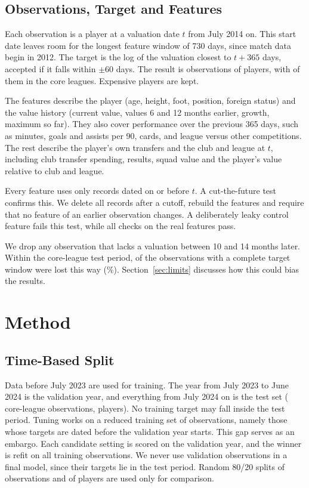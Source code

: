 \documentclass[conference]{IEEEtran}
\begin{document}
\subsection{Observations, Target and Features}
Each observation is a player at a valuation date $t$ from July 2014 on. This start date leaves room for the longest feature window of 730 days, since match data begin in 2012. The target is the log of the valuation closest to $t+365$ days, accepted if it falls within $\pm$60 days. The result is \NRows{} observations of \NPlayers{} players, with \NCoreRows{} of them in the core leagues. Expensive players are kept.

The \NFeatures{} features describe the player (age, height, foot, position, foreign status) and the value history (current value, values 6 and 12 months earlier, growth, maximum so far). They also cover performance over the previous 365 days, such as minutes, goals and assists per 90, cards, and league versus other competitions. The rest describe the player's own transfers and the club and league at $t$, including club transfer spending, results, squad value and the player's value relative to club and league.

Every feature uses only records dated on or before $t$. A cut-the-future test confirms this. We delete all records after a cutoff, rebuild the features and require that no feature of an earlier observation changes. A deliberately leaky control feature fails this test, while all \NLeakPassed{} checks on the real features pass.

We drop any observation that lacks a valuation between 10 and 14 months later. Within the core-league test period, \DropTest{} of the \DropTestComplete{} observations with a complete target window were lost this way (\DropRateTest\%). Section~\ref{sec:limits} discusses how this could bias the results.

\section{Method}

\subsection{Time-Based Split}
Data before July 2023 are used for training. The year from July 2023 to June 2024 is the validation year, and everything from July 2024 on is the test set (\NTest{} core-league observations, \NTestPlayers{} players). No training target may fall inside the test period. Tuning works on a reduced training set of \NTune{} observations, namely those whose targets are dated before the validation year starts. This gap serves as an embargo. Each candidate setting is scored on the validation year, and the winner is refit on all \NTrain{} training observations. We never use validation observations in a final model, since their targets lie in the test period. Random 80/20 splits of observations and of players are used only for comparison.
\end{document}
